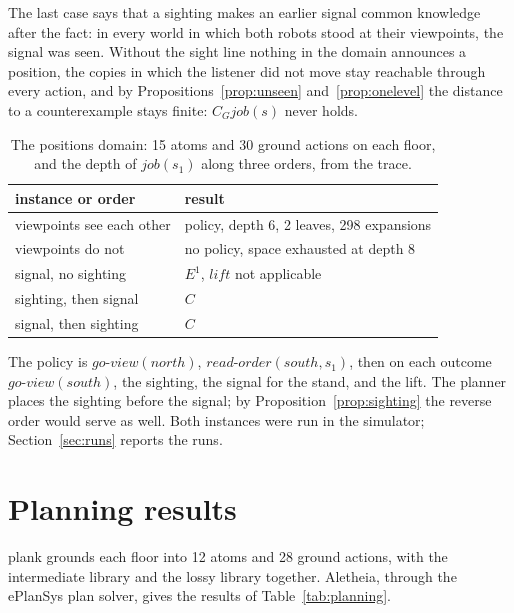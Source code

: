 \documentclass[11pt,a4paper]{article}
\theoremstyle{definition}
\newcommand{\Cop}[1]{C_{#1}}
\newcommand{\ag}[1]{\mathit{#1}}
\newcommand{\job}{\mathit{job}}
\begin{document}
\noindent
The last case says that a sighting makes an earlier signal common knowledge
after the fact: in every world in which both robots stood at their viewpoints,
the signal was seen. Without the sight line nothing in the domain announces a
position, the copies in which the listener did not move stay reachable through
every action, and by Propositions~\ref{prop:unseen} and~\ref{prop:onelevel} the
distance to a counterexample stays finite: $\Cop{G}\job(s)$ never holds.

\begin{table}[H]
\centering\small
\caption{The positions domain: 15 atoms and 30 ground actions on each floor,
and the depth of $\job(s_1)$ along three orders, from the trace.}
\label{tab:positions}
\begin{tabular}{@{}l l@{}}
\toprule
instance or order & result \\
\midrule
viewpoints see each other & policy, depth 6, 2 leaves, 298 expansions \\
viewpoints do not & no policy, space exhausted at depth 8 \\
signal, no sighting & $E^1$, $\mathit{lift}$ not applicable \\
sighting, then signal & $C$ \\
signal, then sighting & $C$ \\
\bottomrule
\end{tabular}
\end{table}

\noindent
The policy is $\mathit{go\text{-}view}(\ag{north})$,
$\mathit{read\text{-}order}(\ag{south}, s_1)$, then on each outcome
$\mathit{go\text{-}view}(\ag{south})$, the sighting, the signal for the stand,
and the lift. The planner places the sighting before the signal; by
Proposition~\ref{prop:sighting} the reverse order would serve as well. Both
instances were run in the simulator; Section~\ref{sec:runs} reports the runs.

\section{Planning results}
\label{sec:planning}

plank grounds each floor into 12 atoms and 28 ground actions, with the
intermediate library and the lossy library together. Aletheia, through the
ePlanSys plan solver, gives the results of Table~\ref{tab:planning}.
\end{document}
